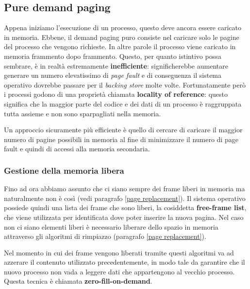 %
\subsection{Pure demand paging}
Appena iniziamo l'esecuzione di un processo, questo deve ancora essere caricato in memoria. Ebbene, il demand paging puro consiste nel caricare solo le pagine del processo che vengono richieste. In altre parole il processo viene caricato in memoria frammento dopo frammento. Questo, per quanto istintivo possa sembrare, è in realtà estremamente \textbf{inefficiente}: significherebbe aumentare generare un numero elevatissimo di \textit{page fault} e di conseguenza il sistema operativo dovrebbe passare per il \textit{backing store} molte volte. Fortunatamente però i processi godono di una proprietà chiamata \textbf{locality of reference}: questo significa che la maggior parte del codice e dei dati di un processo è raggruppata tutta assieme e non sono sparpagliati nella memoria.

Un approccio sicuramente più efficiente è quello di cercare di caricare il maggior numero di pagine possibili in memoria al fine di minimizzare il numero di page fault e quindi di accessi alla memoria secondaria.

% 
\subsubsection*{Gestione della memoria libera}
Fino ad ora abbiamo assunto che ci siano sempre dei frame liberi in memoria ma naturalmente non è così (vedi paragrafo \ref{page replacement}). Il sistema operativo possiede quindi una lista dei frame che sono liberi, la cosiddetta \textbf{free-frame list}, che viene utilizzata per identificata dove poter inserire la nuova pagina. Nel caso non ci siano elementi liberi è necessario liberare dello spazio in memoria attraverso gli algoritmi di rimpiazzo (paragrafo \ref{page replacement}).

Nel momento in cui dei frame vengono liberati tramite questi algoritmi va ad azzerare il contenuto utilizzato precedentemente, in modo tale da garantire che il nuovo processo non vada a leggere dati che appartengono al vecchio processo. Questa tecnica è chiamata \textbf{zero-fill-on-demand}.

% 
